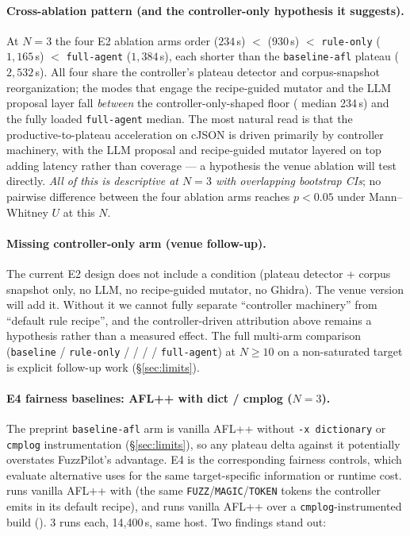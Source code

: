 \documentclass[11pt]{article}
\begin{document}
\paragraph{Cross-ablation pattern (and the controller-only
hypothesis it suggests).}
At $N{=}3$ the four E2 ablation arms order
 ($234$\,s) $<$ 
($930$\,s) $<$ \texttt{rule-only} ($1{,}165$\,s) $<$
\texttt{full-agent} ($1{,}384$\,s), each shorter than the
\texttt{baseline-afl} plateau ($2{,}532$\,s). All four share the
controller's plateau detector and corpus-snapshot reorganization;
the modes that engage the recipe-guided mutator and the LLM
proposal layer fall \emph{between} the controller-only-shaped
floor ( median 234\,s) and the fully
loaded \texttt{full-agent} median. The most natural read is that
the productive-to-plateau acceleration on cJSON is driven
primarily by controller machinery, with the LLM proposal and
recipe-guided mutator layered on top adding latency rather than
coverage --- a hypothesis the venue
 ablation will test directly. \emph{All
of this is descriptive at $N{=}3$ with overlapping bootstrap
CIs}; no pairwise difference between the four ablation arms
reaches $p{<}0.05$ under Mann--Whitney $U$ at this $N$.

\paragraph{Missing controller-only arm (venue follow-up).}
The current E2 design does not include a
 condition (plateau detector + corpus
snapshot only, no LLM, no recipe-guided mutator, no Ghidra). The
venue version will add it. Without it we cannot fully separate
``controller machinery'' from ``default rule recipe'', and the
controller-driven attribution above remains a hypothesis rather
than a measured effect. The full multi-arm comparison
(\texttt{baseline} / \texttt{rule-only} /  /
 /  /
\texttt{full-agent}) at $N{\geq}10$ on a non-saturated target is
explicit follow-up work (\S\ref{sec:limits}).

\paragraph{E4 fairness baselines: AFL++ with dict / cmplog
($N{=}3$).}
The preprint \texttt{baseline-afl} arm is vanilla AFL++ without
\texttt{-x dictionary} or \texttt{cmplog} instrumentation
(\S\ref{sec:limits}), so any plateau delta against it potentially
overstates FuzzPilot's advantage. E4 is the corresponding
fairness controls, which evaluate alternative uses for the
same target-specific information or runtime cost.
 runs vanilla AFL++ with 
(the same \texttt{FUZZ}/\texttt{MAGIC}/\texttt{TOKEN} tokens the
controller emits in its default recipe), and 
runs vanilla AFL++ over a
\texttt{cmplog}-instrumented build ().
3 runs each, 14{,}400\,s, same host. Two findings stand out:
\end{document}
